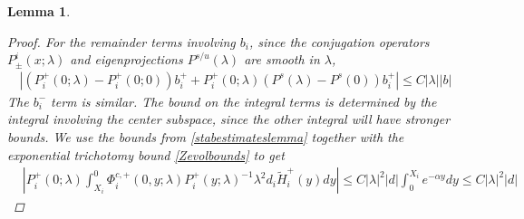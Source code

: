 \documentclass[10pt,reqno]{amsart}
\theoremstyle{plain}
\newtheorem{lemma}[theorem]{Lemma}
\theoremstyle{definition}
\theoremstyle{remark}
\numberwithin{theorem}{section}
\numberwithin{equation}{section}
\begin{document}
\begin{lemma}
\begin{proof}
For the remainder terms involving $b_i$, since the conjugation operators $P^i_\pm(x; \lambda)$ and eigenprojections $P^{s/u}(\lambda)$ are smooth in $\lambda$, 
\begin{align*}
|(P_i^+(0; \lambda) - P_i^+(0; 0))b_i^+ + P_i^+(0; \lambda) (P^s(\lambda) - P^s(0)) b_i^+| \leq C |\lambda| |b|
\end{align*}
The $b_i^-$ term is similar. The bound on the integral terms is determined by the integral involving the center subspace, since the other integral will have stronger bounds. We use the bounds from \cref{stabestimateslemma} together with the exponential trichotomy bound \cref{Zevolbounds} to get
\begin{align*}
&\left| P_i^+(0; \lambda) \int_{X_i}^0 \Phi_i^{c,+}(0, y; \lambda) P_i^+(y; \lambda)^{-1} \lambda^2 d_i \tilde{H}_i^+(y) dy \right| \leq C |\lambda|^2 |d| \int_0^{X_i} e^{-\alpha y} dy \leq C |\lambda|^2 |d|
\end{align*}


\end{proof}
\end{lemma}
\end{document}
